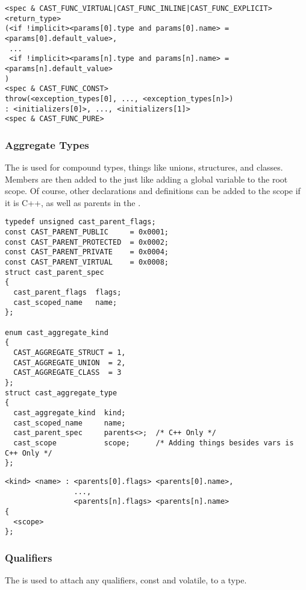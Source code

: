 \begin{verbatim}
<spec & CAST_FUNC_VIRTUAL|CAST_FUNC_INLINE|CAST_FUNC_EXPLICIT> <return_type>
(<if !implicit><params[0].type and params[0].name> = <params[0].default_value>,
 ...
 <if !implicit><params[n].type and params[n].name> = <params[n].default_value>
)
<spec & CAST_FUNC_CONST>
throw(<exception_types[0], ..., <exception_types[n]>)
: <initializers[0]>, ..., <initializers[1]>
<spec & CAST_FUNC_PURE>
\end{verbatim}

\subsubsection{Aggregate Types}

The  is used for compound types, things like unions,
structures, and classes.  Members are then added to the  just
like adding a global variable to the root scope.  Of course, other declarations
and definitions can be added to the scope if it is C++, as well as parents in
the .

\begin{verbatim}
typedef unsigned cast_parent_flags;
const CAST_PARENT_PUBLIC     = 0x0001;
const CAST_PARENT_PROTECTED  = 0x0002;
const CAST_PARENT_PRIVATE    = 0x0004;
const CAST_PARENT_VIRTUAL    = 0x0008;
struct cast_parent_spec
{
  cast_parent_flags  flags;
  cast_scoped_name   name;
};

enum cast_aggregate_kind
{
  CAST_AGGREGATE_STRUCT = 1,
  CAST_AGGREGATE_UNION  = 2,
  CAST_AGGREGATE_CLASS  = 3
};
struct cast_aggregate_type
{
  cast_aggregate_kind  kind;
  cast_scoped_name     name;
  cast_parent_spec     parents<>;  /* C++ Only */
  cast_scope           scope;      /* Adding things besides vars is C++ Only */
};
\end{verbatim}

\begin{verbatim}
<kind> <name> : <parents[0].flags> <parents[0].name>,
                ...,
                <parents[n].flags> <parents[n].name>
{
  <scope>
};
\end{verbatim}

\subsubsection{Qualifiers}

The  is used to attach any qualifiers, const and
volatile, to a type.

